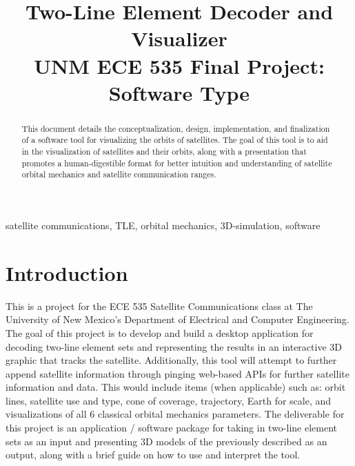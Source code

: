 \documentclass[conference]{IEEEtran}
\begin{document}

	\title{Two-Line Element Decoder and Visualizer\\
		{\footnotesize UNM ECE 535 Final Project: Software Type}
	}

	\author{
	}

	\maketitle

	\begin{abstract}
		This document details the conceptualization, design, implementation, and finalization of a software tool for visualizing the orbits of satellites. The goal of this tool is to aid in the visualization of satellites and their orbits, along with a presentation that promotes a human-digestible format for better intuition and understanding of satellite orbital mechanics and satellite communication ranges.
	\end{abstract}

	\begin{IEEEkeywords}
		satellite communications, TLE, orbital mechanics, 3D-simulation, software
	\end{IEEEkeywords}

	\section{Introduction}
		This is a project for the ECE 535 Satellite Communications class at The University of New Mexico's Department of Electrical and Computer Engineering. The goal of this project is to develop and build a desktop application for decoding two-line element sets and representing the results in an interactive 3D graphic that tracks the satellite. Additionally, this tool will attempt to further append satellite information through pinging web-based APIs for further satellite information and data. This would include items (when applicable) such as: orbit lines, satellite use and type, cone of coverage, trajectory, Earth for scale, and visualizations of all 6 classical orbital mechanics parameters. The deliverable for this project is an application / software package for taking in two-line element sets as an input and presenting 3D models of the previously described as an output, along with a brief guide on how to use and interpret the tool.
\end{document}
